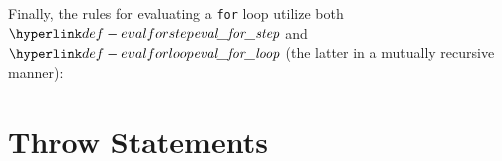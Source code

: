Finally, the rules for evaluating a \texttt{for} loop utilize both $\evalforstep$
and \\
$\evalforloop$ (the latter in a mutually recursive manner):
\begin{mathpar}
\end{mathpar}

\begin{mathpar}
\end{mathpar}

\hypertarget{def-throwstatementterm}{}
\section{Throw Statements\label{sec:ThrowStatements}}
